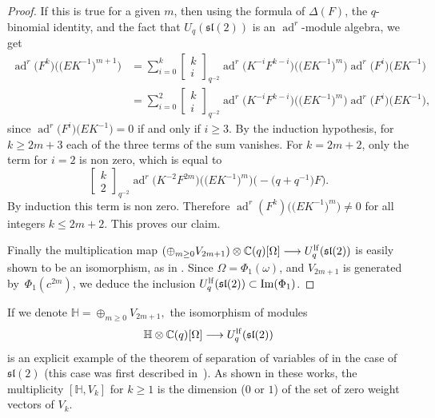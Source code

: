 \documentclass[pdftex]{sigma}%
\numberwithin{equation}{section}
\numberwithin{figure}{section}
\newcommand{\mc}{\mathbb{C}}
\newcommand{\lra}{\longrightarrow}
\begin{document}
\begin{proof}
If this is true for a given $m$, then using the formula of $\Delta(F)$, the $q$-binomial identity, and the fact that $U_q({\mathfrak{sl}}(2))$ is an $\operatorname{ad}^r$-module algebra, we get
\begin{align*}
\operatorname{ad}^r\big(F^k\big)\big(\big(EK^{-1}\big)^{m+1}\big) & = \sum_{i=0}^{k} \left[\begin{matrix} k \\ i \end{matrix}\right]_{q^{-2}} \operatorname{ad}^r\big(K^{-i}F^{k-i}\big)\big(\big(EK^{-1}\big)^{m}\big) \operatorname{ad}^r\big(F^i\big)\big(EK^{-1}\big)\\
 &= \sum_{i=0}^{2} \left[\begin{matrix} k \\ i \end{matrix}\right]_{q^{-2}} \operatorname{ad}^r\big(K^{-i}F^{k-i}\big)\big(\big(EK^{-1}\big)^{m}\big) \operatorname{ad}^r\big(F^i\big)\big(EK^{-1}\big),
 \end{align*}
since $\operatorname{ad}^r\big(F^i\big)\big(EK^{-1}\big)=0$ if and only if $i\geq 3$. By the induction hypothesis, for $k\geq 2m+3$ each of the three terms of the sum vanishes. For $k=2m+2$, only the term for $i=2$ is non zero, which is equal to
\begin{equation*}
\left[\begin{matrix} k \\ 2 \end{matrix}\right]_{q^{-2}} \operatorname{ad}^r\big(K^{-2}F^{2m}\big)\big(\big(EK^{-1}\big)^{m}\big) \big({-}\big(q+q^{-1}\big)F\big).
\end{equation*}
By induction this term is non zero. Therefore $\operatorname{ad}^r(F^k)\big(\big(EK^{-1}\big)^m\big)\ne 0$ for all integers $k\leq 2m+2.$ This proves our claim.

Finally the multiplication map $\left( \oplus_{m\geq 0} V_{2m+1}\right) \otimes \mc(q)[\Omega] \lra U_q^{\rm lf}({\mathfrak{sl}}(2))$ is easily shown to be an isomorphism, as in \cite[Section~3.11]{JL}. Since $\Omega=\Phi_1(\omega)$, and $V_{2m+1}$ is generated by~$\Phi_1(c^{2m})$, we deduce the inclusion $U_q^{\rm lf}({\mathfrak{sl}}(2))\subset \operatorname{Im}(\Phi_1)$.\end{proof}

\begin{remk}If we denote ${\mathbb H}=\oplus_{m\geq 0} V_{2m+1},$ the isomorphism of modules \[{\mathbb H} \otimes \mc(q)[\Omega] \lra U_q^{\rm lf}({\mathfrak{sl}}(2))\] is an explicit example of the theorem of separation of variables of \cite{Bau1, JL2} in the case of ${\mathfrak{sl}}(2)$ (this case was first described in~\cite{JL}). As shown in these works, the multiplicity $[{\mathbb H}, V_k]$ for $k\geq 1$ is the dimension ($0$ or $1$) of the set of zero weight vectors of $V_k$.
\end{remk}
\end{document}
